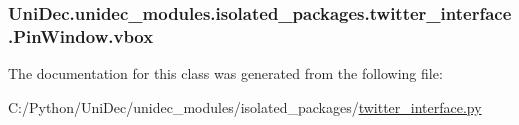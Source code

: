 \subsubsection[{vbox}]{\setlength{\rightskip}{0pt plus 5cm}Uni\+Dec.\+unidec\+\_\+modules.\+isolated\+\_\+packages.\+twitter\+\_\+interface.\+Pin\+Window.\+vbox}\label{class_uni_dec_1_1unidec__modules_1_1isolated__packages_1_1twitter__interface_1_1_pin_window_a2627bc2b7eff1c2be0889adf41bb79ca}


The documentation for this class was generated from the following file\+:\begin{DoxyCompactItemize}
\item 
C\+:/\+Python/\+Uni\+Dec/unidec\+\_\+modules/isolated\+\_\+packages/\hyperlink{twitter__interface_8py}{twitter\+\_\+interface.\+py}\end{DoxyCompactItemize}
